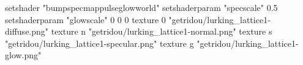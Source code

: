 setshader "bumpspecmappulseglowworld"
setshaderparam "specscale" 0.5
setshaderparam "glowscale" 0 0 0
texture 0 "getridou/lurking_lattice1-diffuse.png"
texture n "getridou/lurking_lattice1-normal.png"
texture s "getridou/lurking_lattice1-specular.png"
texture g "getridou/lurking_lattice1-glow.png"